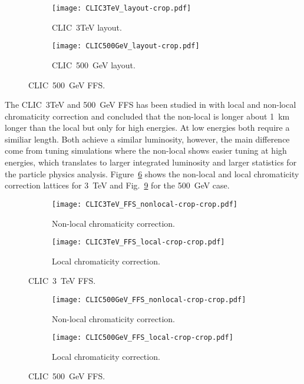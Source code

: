 \begin{figure}[h]
\centering
\begin{subfigure}{1.0\textwidth}
\texttt{[image: CLIC3TeV\_layout-crop.pdf]}\caption{CLIC~3TeV layout.}\label{f:CLIC3TeVlayout} 
\end{subfigure}\par
\begin{subfigure}{1.0\textwidth}
\texttt{[image: CLIC500GeV\_layout-crop.pdf]}\caption{CLIC~500~GeV layout.}\label{f:CLIC500GeVlayout} 
\end{subfigure}\caption{CLIC~500~GeV FFS.}\label{f:CLIClayout}
\end{figure}
The CLIC~3TeV and 500~GeV FFS has been studied in \cite{GarciaMorales:1982827} with local and non-local chromaticity correction and concluded that the non-local is longer about 1~km longer than the local but only for high energies. At low energies both require a similiar length. Both achieve a similar luminosity, however, the main difference come from tuning simulations where the non-local shows easier tuning at high energies, which translates to larger integrated luminosity and larger statistics for the particle physics analysis. Figure~\ref{f:CLIC3TeVFFS} shows the non-local and local chromaticity correction lattices for 3~TeV and Fig.~\ref{f:CLIC500GeVFFS} for the 500~GeV case.\par
\begin{figure}[h]
\centering
\begin{subfigure}{0.5\textwidth}
\texttt{[image: CLIC3TeV\_FFS\_nonlocal-crop-crop.pdf]}\caption{Non-local chromaticity correction.}\label{f:CLIC3TeVFFSnonlocal}
\end{subfigure}\hspace*{0.5cm}
\begin{subfigure}{0.5\textwidth}
\texttt{[image: CLIC3TeV\_FFS\_local-crop-crop.pdf]}\caption{Local chromaticity correction.}\label{f:CLIC3TeVFFSlocal} 
\end{subfigure}\caption{CLIC~3~TeV FFS.}\label{f:CLIC3TeVFFS}
\end{figure}
\begin{figure}[h]
\centering
\begin{subfigure}{0.5\textwidth}
\texttt{[image: CLIC500GeV\_FFS\_nonlocal-crop-crop.pdf]}\caption{Non-local chromaticity correction.}\label{f:CLIC500GeVFFSnonlocal} 
\end{subfigure}\hspace*{0.5cm}
\begin{subfigure}{0.5\textwidth}
\texttt{[image: CLIC500GeV\_FFS\_local-crop-crop.pdf]}\caption{Local chromaticity correction.}\label{f:CLIC500GeVFFSlocal} 
\end{subfigure}\caption{CLIC~500~GeV FFS.}\label{f:CLIC500GeVFFS}
\end{figure}

